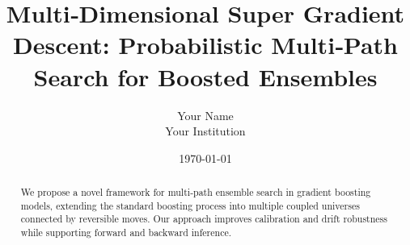 \documentclass[11pt]{article}
\title{Multi‑Dimensional Super Gradient Descent: Probabilistic Multi‑Path Search for Boosted Ensembles}
\author{Your Name\\Your Institution}
\date{\today}
\begin{document}
\maketitle

\begin{abstract}
We propose a novel framework for multi‑path ensemble search in gradient boosting models, extending the standard boosting process into multiple coupled universes connected by reversible moves. Our approach improves calibration and drift robustness while supporting forward and backward inference.
\end{abstract}

\end{document}
